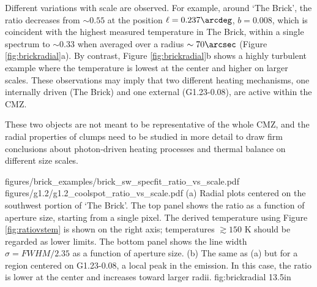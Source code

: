 Different variations with scale are observed.  For example, around `The Brick',
the ratio decreases from $\sim0.55$ at the position $\ell=0.237\arcdeg$,
$b=0.008$, which is coincident with the highest measured temperature in The
Brick, within a single spectrum to $\sim0.33$ when averaged over a radius
$\sim70\arcsec$ (Figure \ref{fig:brickradial}a).  By contrast, Figure
\ref{fig:brickradial}b shows a highly turbulent example where the temperature
is lowest at the center and higher on larger scales.  
These observations may imply that two different heating mechanisms, one
internally driven (The Brick) and one external (G1.23-0.08), are active within
the CMZ.


These two objects are not meant to be representative of the whole CMZ, and the
radial properties of clumps need to be studied in more detail to draw firm
conclusions about photon-driven heating processes and thermal balance on
different size scales.  

\FigureTwo
{figures/brick_examples/brick_sw_specfit_ratio_vs_scale.pdf}
{figures/g1.2/g1.2_coolspot_ratio_vs_scale.pdf}
{ (a) Radial plots centered on the southwest portion of `The Brick'.
The top panel shows the ratio \Rone as a function of aperture size, starting
from a single pixel.
The derived temperature using Figure \ref{fig:ratiovstem} is shown on the right
axis; temperatures $\gtrsim150$ K should be regarded as lower limits.
The bottom panel shows the line width $\sigma = FWHM/2.35$
as a function of aperture size.  
(b) The same as (a) but for a region centered on G1.23-0.08, a local
peak in the \para \threeohthree emission.  In this case,
the ratio \Rone is lower at the center and increases toward larger radii.
}
{fig:brickradial}
{1}{3.5in}



